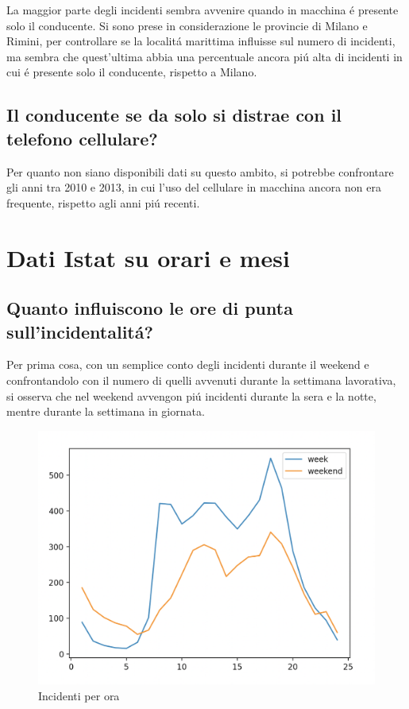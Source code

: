 \documentclass[a4paper]{report}
\begin{document}
La maggior parte degli incidenti sembra avvenire quando in macchina \'e presente solo il conducente.
Si sono prese in considerazione le provincie di Milano e Rimini, per controllare se la localit\'a 
marittima influisse sul numero di incidenti, ma sembra che quest'ultima abbia una percentuale 
ancora pi\'u alta di incidenti in cui \'e presente solo il conducente, rispetto a Milano.

\clearpage
\subsection{Il conducente se da solo si distrae con il telefono cellulare?}

Per quanto non siano disponibili dati su questo ambito, si potrebbe confrontare gli anni tra 2010 e 2013, 
in cui l'uso del cellulare in macchina ancora non era frequente, rispetto agli anni pi\'u recenti.



\clearpage
\section{Dati Istat su orari e mesi}

\clearpage
\subsection{Quanto influiscono le ore di punta sull'incidentalit\'a?}

Per prima cosa, con un semplice conto degli incidenti durante il weekend 
e confrontandolo con il numero di quelli avvenuti durante la 
settimana lavorativa, si osserva che nel weekend avvengon pi\'u incidenti 
durante la sera e la notte, mentre durante la settimana in giornata.

\begin{figure}[!ht]
    \includegraphics[width=\linewidth]{../src/incidenti/incidenti_senza_coords/ore_punta/week_weekend.png}
    \caption{Incidenti per ora}
    \label{fig:week_weekend}
\end{figure}
\end{document}

